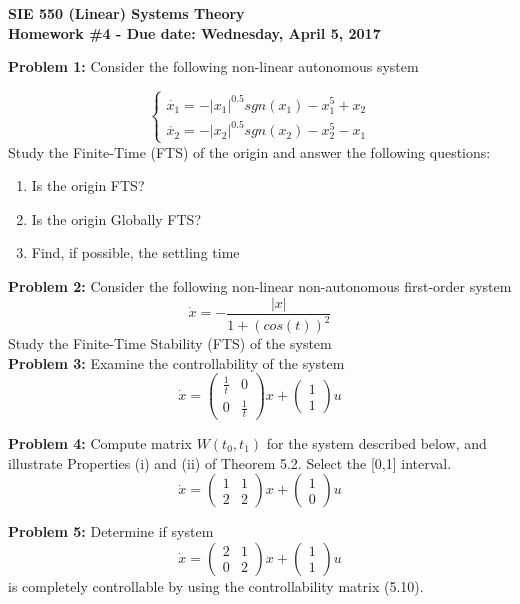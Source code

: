 \documentclass[12pt]{article}
\begin{document}
{\centering
 \textbf{SIE 550 (Linear) Systems Theory\\Homework \#4 - Due date: Wednesday, April 5, 2017 \newline}\par
 
} 

\noindent
\textbf{Problem 1:} Consider the following non-linear autonomous system

$$
\begin{cases} 
	\dot{x_1} = - |x_1|^{0.5} sgn(x_1)- x_1^5+x_2 \\
	\dot{x_2}=-|x_2|^{0.5} sgn(x_2)-x_2^5-x_1
\end{cases}
$$
Study the Finite-Time (FTS) of the origin and answer the following questions:
\begin{enumerate}
	\item Is the origin FTS?
	\item Is the origin Globally FTS?
	\item Find, if possible, the settling time
\end{enumerate}

\noindent
\textbf{Problem 2:} Consider the following non-linear non-autonomous first-order system
$$
\dot{x}=-\frac{|x|}{1+(cos(t))^2}
$$
Study the Finite-Time Stability (FTS) of the system \\

\noindent
\textbf{Problem 3:} Examine the controllability of the system
$$
\dot{x}=
\begin{pmatrix} 
	\frac{1}{t} & 0 \\
	0 & \frac{1}{t}
\end{pmatrix} x + 
\begin{pmatrix} 
1 \\
1
\end{pmatrix} u
$$

\noindent
\textbf{Problem 4:} Compute matrix $W(t_0,t_1)$ for the system described below, and illustrate Properties (i) and (ii) of Theorem 5.2. Select the [0,1] interval.
$$
\dot{x}=
\begin{pmatrix}
	1 & 1 \\
	2 & 2
\end{pmatrix}
x + 
\begin{pmatrix}
	1 \\
	0
\end{pmatrix} u
$$

\noindent
\textbf{Problem 5:} Determine if system
$$ \dot{x} = 
\begin{pmatrix}
	2 & 1 \\
	0 & 2
\end{pmatrix} x +
\begin{pmatrix} 
	1 \\
	1
\end{pmatrix} u
$$
is completely controllable by using the controllability matrix (5.10). \\
\end{document}
